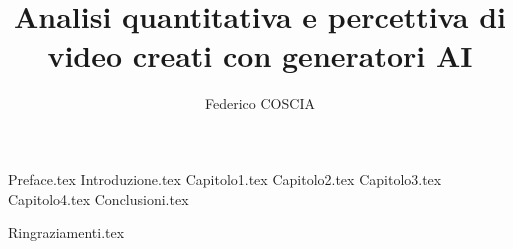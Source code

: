 \documentclass[a4paper,12pt]{report}
\begin{document}
\title{Analisi quantitativa e percettiva di video creati con generatori AI}
\author{Federico COSCIA}

{Preface.tex}
{Introduzione.tex}
{Capitolo1.tex}
{Capitolo2.tex}
{Capitolo3.tex}
{Capitolo4.tex}
{Conclusioni.tex}

% 
% 
{Ringraziamenti.tex}
\end{document}
